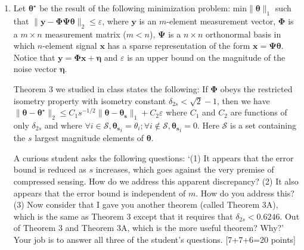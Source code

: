 \documentclass[11pt]{article}
\begin{document}
\begin{enumerate}
\item Let $\boldsymbol{\theta^{\star}}$ be the result of the following minimization problem: $\textrm{min} \|\boldsymbol{\theta}\|_1$ such that $\|\boldsymbol{y}-\boldsymbol{\Phi \Psi \theta}\|_2 \leq \varepsilon$, where $\boldsymbol{y}$ is an $m$-element measurement vector, $\boldsymbol{\Phi}$ is a $m \times n$ measurement matrix ($m < n$), $\boldsymbol{\Psi}$ is a $n \times n$ orthonormal basis in which $n$-element signal $\boldsymbol{x}$ has a sparse representation of the form $\boldsymbol{x} = \boldsymbol{\Psi \theta}$. Notice that $\boldsymbol{y} = \boldsymbol{\Phi x} + \boldsymbol{\eta}$ and $\varepsilon$ is an upper bound on the magnitude of the noise vector $\boldsymbol{\eta}$.

Theorem 3 we studied in class states the following: If $\boldsymbol{\Phi}$ obeys the restricted isometry property with isometry constant $\delta_{2s} < \sqrt{2}-1$, then we have $\|\boldsymbol{\theta} - \boldsymbol{\theta^{\star}}\|_2 \leq C_1 s^{-1/2}\|\boldsymbol{\theta}-\boldsymbol{\theta_s}\|_1 + C_2 \varepsilon$ where $C_1$ and $C_2$ are functions of only $\delta_{2s}$ and where $\forall i \in \mathcal{S}, \boldsymbol{\theta_s}_i = \theta_i; \forall i \notin \mathcal{S}, \boldsymbol{\theta_s}_i = 0$. Here $\mathcal{S}$ is a set containing the $s$ largest magnitude elements of $\boldsymbol{\theta}$. 

A curious student asks the following questions: `(1) It appears that the error bound is reduced as $s$ increases, which goes against the very premise of compressed sensing. How do we address this apparent discrepancy? (2) It also appears that the error bound is independent of $m$. How do you address this? (3) Now consider that I gave you another theorem (called Theorem 3A), which is the same as Theorem 3 except that it requires that $\delta_{2s} < 0.6246$. Out of Theorem 3 and Theorem 3A, which is the more useful theorem? Why?' 
\\
Your job is to answer all three of the student's questions. \textsf{[7+7+6=20 points]}


\end{enumerate}
\end{document}
